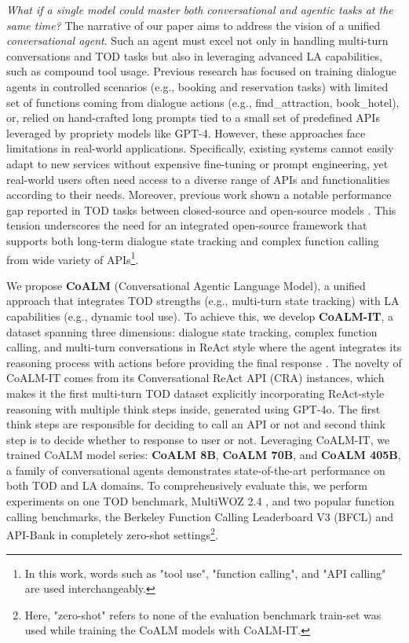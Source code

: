 \textit{What if a single model could master both conversational and agentic tasks at the same time?}
The narrative of our paper aims to address the vision of a unified \textit{conversational agent}. 
Such an agent must excel not only in handling multi-turn conversations and TOD tasks but also in leveraging advanced LA capabilities, such as compound tool usage.
Previous research has focused on training dialogue agents in controlled scenarios (e.g., booking and reservation tasks) \cite{li2024largelanguagemodelszeroshot} with limited set of functions coming from dialogue actions (e.g., find\_attraction, book\_hotel), or, relied on hand-crafted long prompts tied to a small set of predefined APIs \cite{xu-etal-2024-rethinking} leveraged by propriety models like GPT-4. However, these approaches face limitations in real-world applications. Specifically, existing systems cannot easily adapt to new services without expensive fine-tuning or prompt engineering, yet real-world users often need access to a diverse range of APIs and functionalities according to their needs. 
Moreover, previous work shown a notable performance gap reported in TOD tasks between closed-source and open-source models \cite{hudecek-dusek-2023-large, xu-etal-2024-rethinking, li2024largelanguagemodelszeroshot}.
This tension underscores the need for an integrated open-source framework that supports both long-term dialogue state tracking and complex function calling from wide variety of APIs\footnote{In this work, words such as "tool use", "function calling", and "API calling" are used interchangeably.}.


We propose \textbf{CoALM} (Conversational Agentic Language Model), a unified approach that integrates TOD strengths (e.g., multi-turn state tracking) with LA capabilities (e.g., dynamic tool use). To achieve this, we develop \textbf{CoALM-IT}, a dataset spanning three dimensions: dialogue state tracking, complex function calling, and multi-turn conversations in ReAct style where the agent integrates its reasoning process with actions before providing the final response \cite{yao2023reactsynergizingreasoningacting-react}. The novelty of CoALM-IT comes from its Conversational ReAct API (CRA) instances, which makes it the first multi-turn TOD dataset explicitly incorporating ReAct-style reasoning with multiple think steps inside, generated using GPT-4o. The first think steps are responsible for deciding to call an API or not and second think step is to decide whether to response to user or not. Leveraging CoALM-IT, we trained CoALM model series: \textbf{CoALM 8B}, \textbf{CoALM 70B}, and \textbf{CoALM 405B}, a family of conversational agents demonstrates state-of-the-art performance on both TOD and LA domains. To comprehensively evaluate this, we perform experiments on one TOD benchmark, MultiWOZ 2.4 \cite{ye-etal-2022-multiwoz}, and two popular function calling benchmarks, the Berkeley Function Calling Leaderboard V3 (BFCL) \cite{bfcl} and API-Bank \cite{li-etal-2023-apibank} in completely zero-shot settings\footnote{Here, "zero-shot" refers to none of the evaluation benchmark train-set was used while training the CoALM models with CoALM-IT.}.


